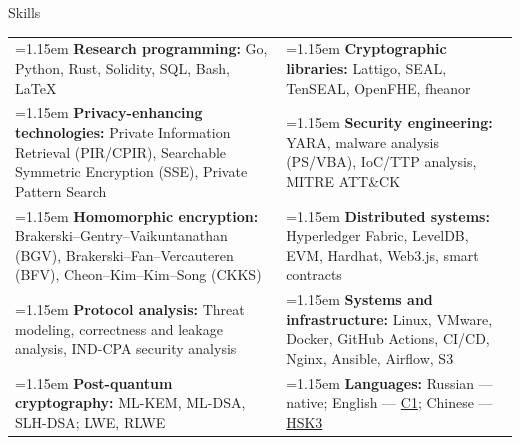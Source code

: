 \documentclass[11pt,a4paper]{article}
\newcommand{\cvrow}[2]{%
  \noindent
  \begin{minipage}[t]{0.145\textwidth}
    \vspace{0pt}%
    \raggedright
    \fontsize{10.5}{12.5}\selectfont
    #1
  \end{minipage}%
  \hfill
  \begin{minipage}[t]{0.835\textwidth}
    \vspace{0pt}%
    #2
  \end{minipage}\par
}
\newcommand{\skillcell}[2]{%
  \noindent
  \hangindent=1.15em
  \hangafter=1
  \makebox[1.15em][l]{$\diamond$}%
  \textbf{#1} #2%
}
\begin{document}
\vspace{0.75em}

\cvrow{Skills}{%
  \begin{tabularx}{\linewidth}
    {@{}>{\raggedright\arraybackslash}X
    @{\hspace{1.2em}}
    >{\raggedright\arraybackslash}X@{}}

    \skillcell{Research programming:}{%
      Go, Python, Rust, Solidity, SQL, Bash, LaTeX}
    &
    \skillcell{Cryptographic libraries:}{%
      Lattigo, SEAL, TenSEAL, OpenFHE, fheanor}
    \\[0.20em]

    \skillcell{Privacy-enhancing technologies:}{%
      Private Information Retrieval (PIR/CPIR),
      Searchable Symmetric Encryption (SSE),
      Private Pattern Search}
    &
    \skillcell{Security engineering:}{%
      YARA, malware analysis (PS/VBA), IoC/TTP analysis,
      MITRE ATT\&CK}
    \\[0.20em]

    \skillcell{Homomorphic encryption:}{%
      Brakerski--Gentry--Vaikuntanathan (BGV),
      Brakerski--Fan--Vercauteren (BFV),
      Cheon--Kim--Kim--Song (CKKS)}
    &
    \skillcell{Distributed systems:}{%
      Hyperledger Fabric, LevelDB,
      EVM, Hardhat, Web3.js, smart contracts}
    \\[0.20em]

    \skillcell{Protocol analysis:}{%
      Threat modeling, correctness and leakage analysis,
      IND-CPA security analysis}
    &
    \skillcell{Systems and infrastructure:}{%
      Linux, VMware, Docker, GitHub Actions, CI/CD, Nginx, Ansible,
      Airflow, S3}
    \\[0.20em]

    \skillcell{Post-quantum cryptography:}{%
      ML-KEM, ML-DSA, SLH-DSA; LWE, RLWE}
    &
    \skillcell{Languages:}{%
      Russian --- native;
      English --- \href{https://iasenovets.github.io/files/toefl_8cd5f4a2b8ec8f34da49ea0faeef43f1.pdf}{C1};
      Chinese --- \href{https://admin.chinesetest.cn/queryScore.do?sid=c2tActR9Wb\%2704b861aefbdc5e9fd0b44afa717d08cbceb0720e582ce25f\%2724d7sWsQ5nVUQSwD}{HSK3}}
  \end{tabularx}
}
\end{document}
